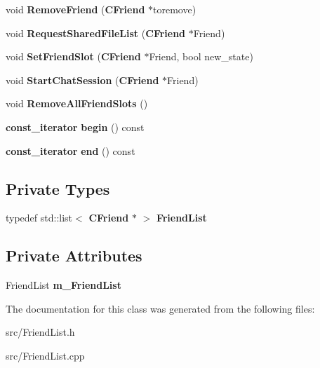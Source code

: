 \begin{DoxyCompactItemize}
\item 
void {\bfseries RemoveFriend} ({\bf CFriend} $\ast$toremove)\label{classCFriendList_ac0b5359d86831c36cb95a7b7a7cea7d3}

\item 
void {\bfseries RequestSharedFileList} ({\bf CFriend} $\ast$Friend)\label{classCFriendList_a70d9303fd64936b9d744ec4e8bbba8cb}

\item 
void {\bfseries SetFriendSlot} ({\bf CFriend} $\ast$Friend, bool new\_\-state)\label{classCFriendList_a9a71f8447a3942a65486f40d32e07e78}

\item 
void {\bfseries StartChatSession} ({\bf CFriend} $\ast$Friend)\label{classCFriendList_a3a5e3349200a957e2dbecb2f622bc15e}

\item 
void {\bfseries RemoveAllFriendSlots} ()\label{classCFriendList_aba078baa828b9322a7208460f42f9e54}

\item 
{\bf const\_\-iterator} {\bfseries begin} () const \label{classCFriendList_a8fdc16f02c26bca807246a93df776d8e}

\item 
{\bf const\_\-iterator} {\bfseries end} () const \label{classCFriendList_a2396ddeb2c4edd2a154fe14919cf268f}

\end{DoxyCompactItemize}
\subsection*{Private Types}
\begin{DoxyCompactItemize}
\item 
typedef std::list$<$ {\bf CFriend} $\ast$ $>$ {\bfseries FriendList}\label{classCFriendList_afbbb6c77c63f51e881c42215d70458ef}

\end{DoxyCompactItemize}
\subsection*{Private Attributes}
\begin{DoxyCompactItemize}
\item 
FriendList {\bfseries m\_\-FriendList}\label{classCFriendList_ae3cf895d81728bf71a7f8dce224ad1bf}

\end{DoxyCompactItemize}


The documentation for this class was generated from the following files:\begin{DoxyCompactItemize}
\item 
src/FriendList.h\item 
src/FriendList.cpp\end{DoxyCompactItemize}
